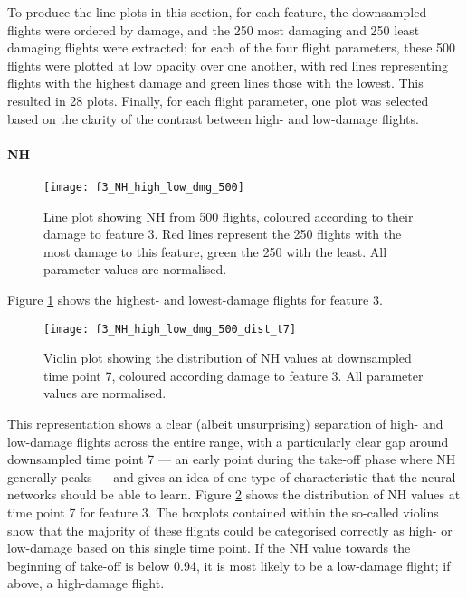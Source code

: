 To produce the line plots in this section, for each feature, the downsampled flights were ordered by damage, and the 250 most damaging and 250 least damaging flights were extracted; for each of the four flight parameters, these 500 flights were plotted at low opacity over one another, with red lines representing flights with the highest damage and green lines those with the lowest. This resulted in 28 plots. Finally, for each flight parameter, one plot was selected based on the clarity of the contrast between high- and low-damage flights.

\paragraph*{NH} \label{sec:data:nh}
\begin{figure}[tb!]
    \centering
    \texttt{[image: f3\_NH\_high\_low\_dmg\_500]}
    \caption{\label{fig:high_low_dmg_NH} Line plot showing NH from 500 flights, coloured according to their damage to feature 3. Red lines represent the 250 flights with the most damage to this feature, green the 250 with the least. All parameter values are normalised.}
\end{figure}

Figure \ref{fig:high_low_dmg_NH} shows the highest- and lowest-damage flights for feature 3.

\begin{figure}[tb!]
    \centering
    \texttt{[image: f3\_NH\_high\_low\_dmg\_500\_dist\_t7]}
    \caption{\label{fig:dmg_violin_NH} Violin plot showing the distribution of NH values at downsampled time point 7, coloured according damage to feature 3. All parameter values are normalised.}
\end{figure}

This representation shows a clear (albeit unsurprising) separation of high- and low-damage flights across the entire range, with a particularly clear gap around downsampled time point 7 --- an early point during the take-off phase where NH generally peaks --- and gives an idea of one type of characteristic that the neural networks should be able to learn. Figure \ref{fig:dmg_violin_NH} shows the distribution of NH values at time point 7 for feature 3. The boxplots contained within the so-called violins show that the majority of these flights could be categorised correctly as high- or low-damage based on this single time point. If the NH value towards the beginning of take-off is below 0.94, it is most likely to be a low-damage flight; if above, a high-damage flight.

